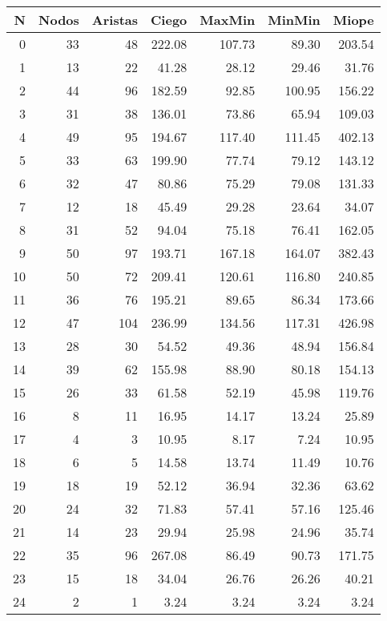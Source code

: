 \begin{longtable}{rrrrrrr}
  \hline
N & Nodos & Aristas & Ciego & MaxMin & MinMin & Miope \\ 
  \hline
  0 &  33 &  48 & 222.08 & 107.73 & 89.30 & 203.54 \\ 
    1 &  13 &  22 & 41.28 & 28.12 & 29.46 & 31.76 \\ 
    2 &  44 &  96 & 182.59 & 92.85 & 100.95 & 156.22 \\ 
    3 &  31 &  38 & 136.01 & 73.86 & 65.94 & 109.03 \\ 
    4 &  49 &  95 & 194.67 & 117.40 & 111.45 & 402.13 \\ 
    5 &  33 &  63 & 199.90 & 77.74 & 79.12 & 143.12 \\ 
    6 &  32 &  47 & 80.86 & 75.29 & 79.08 & 131.33 \\ 
    7 &  12 &  18 & 45.49 & 29.28 & 23.64 & 34.07 \\ 
    8 &  31 &  52 & 94.04 & 75.18 & 76.41 & 162.05 \\ 
    9 &  50 &  97 & 193.71 & 167.18 & 164.07 & 382.43 \\ 
   10 &  50 &  72 & 209.41 & 120.61 & 116.80 & 240.85 \\ 
   11 &  36 &  76 & 195.21 & 89.65 & 86.34 & 173.66 \\ 
   12 &  47 & 104 & 236.99 & 134.56 & 117.31 & 426.98 \\ 
   13 &  28 &  30 & 54.52 & 49.36 & 48.94 & 156.84 \\ 
   14 &  39 &  62 & 155.98 & 88.90 & 80.18 & 154.13 \\ 
   15 &  26 &  33 & 61.58 & 52.19 & 45.98 & 119.76 \\ 
   16 &   8 &  11 & 16.95 & 14.17 & 13.24 & 25.89 \\ 
   17 &   4 &   3 & 10.95 & 8.17 & 7.24 & 10.95 \\ 
   18 &   6 &   5 & 14.58 & 13.74 & 11.49 & 10.76 \\ 
   19 &  18 &  19 & 52.12 & 36.94 & 32.36 & 63.62 \\ 
   20 &  24 &  32 & 71.83 & 57.41 & 57.16 & 125.46 \\ 
   21 &  14 &  23 & 29.94 & 25.98 & 24.96 & 35.74 \\ 
   22 &  35 &  96 & 267.08 & 86.49 & 90.73 & 171.75 \\ 
   23 &  15 &  18 & 34.04 & 26.76 & 26.26 & 40.21 \\ 
   24 &   2 &   1 & 3.24 & 3.24 & 3.24 & 3.24 \\ 

\end{longtable}
